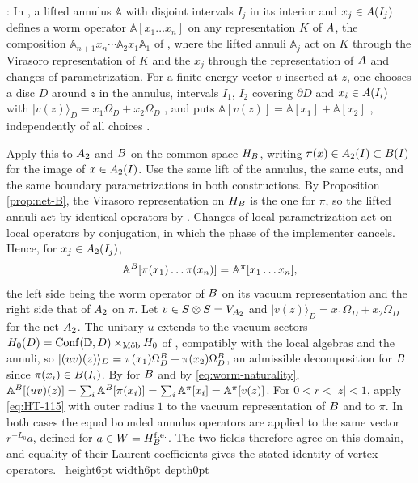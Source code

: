 \documentclass[leqno]{article}
\let\cal\relax
\newcommand{\cal}{\mathcal}
\newcommand{\ra}{\rangle}
\newcommand{\qed}{\hfill \vrule height6pt  width6pt depth0pt}
\newcommand{\ot}{\otimes}
\newenvironment{proof}[1][]{\noindent {\it Proof #1} : }{\hbox{~}\qed
\smallskip
}
\numberwithin{equation}{section}
\begin{document}
\begin{proof}
In \cite[Sections 5 and 6]{HeT25}, a lifted annulus $\mathbb A$ with disjoint intervals $I_j$ in its interior and $x_j \in \cal A(I_j)$ defines a worm operator $\mathbb A[x_1 \ldots x_n]$ on any representation $K$ of $\cal A$, the composition $\mathbb A_{n+1}x_n \cdots \mathbb A_2x_1\mathbb A_1$ of \cite[(45) p.~26]{HeT25}, where the lifted annuli $\mathbb A_j$ act on $K$ through the Virasoro representation of $K$ and the $x_j$ through the representation of $\cal A$ and changes of parametrization. For a finite-energy vector $v$ inserted at $z$, one chooses a disc $D$ around $z$ in the annulus, intervals $I_1$, $I_2$ covering $\partial D$ and $x_i \in \cal A(I_i)$ with $|v(z)\ra_D = x_1\Omega_D+x_2\Omega_D$ \cite[Lemma 6.1 p.~39 and Corollary 6.6 p.~42]{HeT25}, and puts $\mathbb A[v(z)] = \mathbb A[x_1]+\mathbb A[x_2]$ \cite[(73) p.~43]{HeT25}, independently of all choices \cite[Lemma 6.9 p.~43]{HeT25}.

Apply this to $\cal A_2$ and $\cal B$ on the common space $\cal H_{\cal B}$, writing $\pi(x) \in \cal A_2(I) \subset \cal B(I)$ for the image of $x \in \cal A_2(I)$. Use the same lift of the annulus, the same cuts, and the same boundary parametrizations in both constructions. By Proposition \ref{prop:net-B}, the Virasoro representation on $\cal H_{\cal B}$ is the one for $\pi$, so the lifted annuli act by identical operators by \cite[(23)]{HeT25}. Changes of local parametrization act on local operators by conjugation, in which the phase of the implementer cancels. Hence, for $x_j \in \cal A_2(I_j)$,
\begin{equation}
\label{eq:worm-naturality}
\mathbb A^{\cal B}[\pi(x_1) \ldots \pi(x_n)] = \mathbb A^{\pi}[x_1 \ldots x_n],
\end{equation}
the left side being the worm operator of $\cal B$ on its vacuum representation and the right side that of $\cal A_2$ on $\pi$. Let $v \in S \ot S = V_{\cal A_2}$ and $|v(z)\ra_D = x_1\Omega_D+x_2\Omega_D$ for the net $\cal A_2$. The unitary $u$ extends to the vacuum sectors $\cal H_0(D) = \mathrm{Conf}(\mathbb D,D) \times_{\mathrm{M\ddot ob}} \cal H_0$ of \cite[(4) p.~8]{HeT25}, compatibly with the local algebras and the annuli, so $|(uv)(z)\ra_D = \pi(x_1)\Omega^{\cal B}_D+\pi(x_2)\Omega^{\cal B}_D$, an admissible decomposition for $\cal B$ since $\pi(x_i) \in \cal B(I_i)$. By \cite[Lemma 6.9]{HeT25} for $\cal B$ and by \eqref{eq:worm-naturality}, $\mathbb A^{\cal B}[(uv)(z)] = \sum_i \mathbb A^{\cal B}[\pi(x_i)] = \sum_i \mathbb A^\pi[x_i] = \mathbb A^\pi[v(z)]$. For $0<r<|z|<1$, apply \eqref{eq:HT-115} with outer radius $1$ to the vacuum representation of $\cal B$ and to $\pi$. In both cases the equal bounded annulus operators are applied to the same vector $r^{-L_0}a$, defined for $a\in W=\cal H_{\cal B}^{\mathrm{f.e.}}$. The two fields therefore agree on this domain, and equality of their Laurent coefficients gives the stated identity of vertex operators.
\end{proof}
\end{document}
